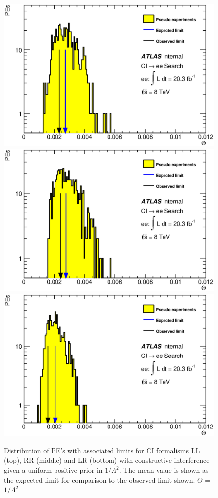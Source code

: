     \begin{figure}[h]
        \begin{center}
            \includegraphics[width=0.7\linewidth]{images/ee__LL_minus_L2/Theta.eps}
            \includegraphics[width=0.7\linewidth]{images/ee__RR_minus_L2/Theta.eps}
            \includegraphics[width=0.7\linewidth]{images/ee__LR_minus_L2/Theta.eps}
        \end{center}
       \caption{Distribution of PE's with associated limits for CI formalisms LL (top), RR (middle) and LR (bottom) with constructive interference given a uniform positive prior in $1/\Lambda^{2}$. The mean value is shown as the expected limit for comparison to the observed limit shown. $\Theta$ = $1/\Lambda^{2}$}
       \label{fig:Theta_CI_con}
    \end{figure}


